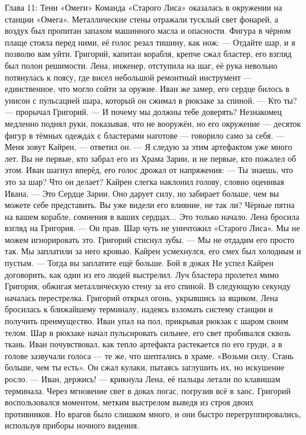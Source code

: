 \documentclass[12pt,a4paper]{book}
\begin{document}
Глава 11: Тени «Омеги»
Команда «Старого Лиса» оказалась в окружении на станции «Омега». Металлические стены отражали тусклый свет фонарей, а воздух был пропитан запахом машинного масла и опасности. Фигура в чёрном плаще стояла перед ними, её голос резал тишину, как нож:  
— Отдайте шар, и я позволю вам уйти.  
Григорий, капитан корабля, крепче сжал бластер, его взгляд был полон решимости. Лена, инженер, отступила на шаг, её рука невольно потянулась к поясу, где висел небольшой ремонтный инструмент — единственное, что могло сойти за оружие. Иван же замер, его сердце билось в унисон с пульсацией шара, который он сжимал в рюкзаке за спиной.  
— Кто ты? — прорычал Григорий. — И почему мы должны тебе доверять?  
Незнакомец медленно поднял руки, показывая, что не вооружён, но его окружение — десяток фигур в тёмных одеждах с бластерами наготове — говорило само за себя.  
— Меня зовут Кайрен, — ответил он. — Я следую за этим артефактом уже много лет. Вы не первые, кто забрал его из Храма Зарии, и не первые, кто пожалел об этом.  
Иван шагнул вперёд, его голос дрожал от напряжения:
— Ты знаешь, что это за шар? Что он делает?  
Кайрен слегка наклонил голову, словно оценивая Ивана.
— Это Сердце Зарии. Оно дарует силу, но забирает больше, чем вы можете себе представить. Вы уже видели его влияние, не так ли? Чёрные пятна на вашем корабле, сомнения в ваших сердцах... Это только начало.  
Лена бросила взгляд на Григория.
— Он прав. Шар чуть не уничтожил «Старого Лиса». Мы не можем игнорировать это.  
Григорий стиснул зубы.
— Мы не отдадим его просто так. Мы заплатили за него кровью.  
Кайрен усмехнулся, его смех был холодным и пустым.
— Тогда вы заплатите ещё больше.  
Бой в доках
Не успел Кайрен договорить, как один из его людей выстрелил. Луч бластера пролетел мимо Григория, обжигая металлическую стену за его спиной. В следующую секунду началась перестрелка. Григорий открыл огонь, укрывшись за ящиком, Лена бросилась к ближайшему терминалу, надеясь взломать систему станции и получить преимущество. Иван упал на пол, прикрывая рюкзак с шаром своим телом.  
Шар в рюкзаке начал пульсировать сильнее, его свет пробивался сквозь ткань. Иван почувствовал, как тепло артефакта растекается по его груди, а в голове зазвучали голоса — те же, что шептались в храме. «Возьми силу. Стань больше, чем ты есть». Он сжал кулаки, пытаясь заглушить их, но искушение росло.  
— Иван, держись! — крикнула Лена, её пальцы летали по клавишам терминала. Через мгновение свет в доках погас, погрузив всё в хаос.  
Григорий воспользовался моментом, метким выстрелом выведя из строя двоих противников. Но врагов было слишком много, и они быстро перегруппировались, используя приборы ночного видения.  
\end{document}
